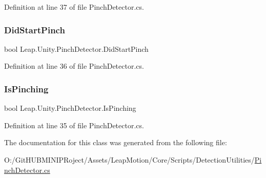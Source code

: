 Definition at line 37 of file Pinch\+Detector.\+cs.

\mbox{\label{class_leap_1_1_unity_1_1_pinch_detector_a39e19b50293ea310376018003c49d18e}} 
\subsubsection{\texorpdfstring{DidStartPinch}{DidStartPinch}}
{\footnotesize\ttfamily bool Leap.\+Unity.\+Pinch\+Detector.\+Did\+Start\+Pinch\hspace{0.3cm}{\ttfamily [get]}}



Definition at line 36 of file Pinch\+Detector.\+cs.

\mbox{\label{class_leap_1_1_unity_1_1_pinch_detector_a2e11562e55156374f77dea79fc53f07b}} 
\subsubsection{\texorpdfstring{IsPinching}{IsPinching}}
{\footnotesize\ttfamily bool Leap.\+Unity.\+Pinch\+Detector.\+Is\+Pinching\hspace{0.3cm}{\ttfamily [get]}}



Definition at line 35 of file Pinch\+Detector.\+cs.



The documentation for this class was generated from the following file\+:\begin{DoxyCompactItemize}
\item 
O\+:/\+Git\+H\+U\+B\+M\+I\+N\+I\+P\+Roject/\+Assets/\+Leap\+Motion/\+Core/\+Scripts/\+Detection\+Utilities/\mbox{\hyperlink{_pinch_detector_8cs}{Pinch\+Detector.\+cs}}\end{DoxyCompactItemize}
